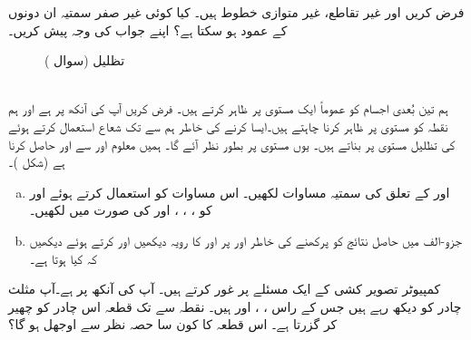 فرض کریں  اور  غیر  تقاطع، غیر متوازی خطوط ہیں۔ کیا کوئی غیر صفر سمتیہ ان دونوں کے عمود  ہو سکتا ہے؟ اپنے جواب کی وجہ پیش کریں۔
\begin{figure}
\centering
{}
\caption{تظلیل (سوال )}
\label{شکل_سوال_سمتیہ_تظلیل}
\end{figure}

\\
ہم تین بُعدی  اجسام کو عموماً  ایک  مستوی پر ظاہر کرتے ہیں۔ فرض کریں آپ کی آنکھ  پر ہے  اور ہم نقطہ  کو مستوی  پر ظاہر کرنا چاہتے ہیں۔ایسا کرنے کی خاطر ہم  سے  تک شعاع استعمال کرتے ہوئے  کی تظلیل مستوی پر بناتے ہیں۔ یوں مستوی پر   بطور  نظر آئے گا۔  ہمیں معلوم  اور  سے  اور  حاصل کرنا ہے (شکل )۔
\begin{enumerate}[a.]
\item
{} اور  کے تعلق کی سمتیہ  مساوات لکھیں۔ اس مساوات کو استعمال کرتے ہوئے  اور  کو ، ،  ،   اور  کی صورت میں لکھیں۔
\item
جزو-الف میں حاصل نتائج کو  پرکھنے کی خاطر  اور  پر  اور  کا رویہ دیکھیں   اور   کرتے ہوئے دیکھیں  کہ کیا ہوتا ہے۔
\end{enumerate}
کمپیوٹر  تصویر کشی    کے ایک مسئلے پر غور کرتے ہیں۔ آپ کی آنکھ  پر ہے۔آپ مثلث چادر کو دیکھ رہے ہیں جس کے راس ، ،   اور   ہیں۔ نقطہ  سے  تک قطعہ اس چادر  کو چھیر کر  گزرتا ہے۔ اس قطعہ  کا کون سا حصہ نظر سے اوجھل ہو گا؟

